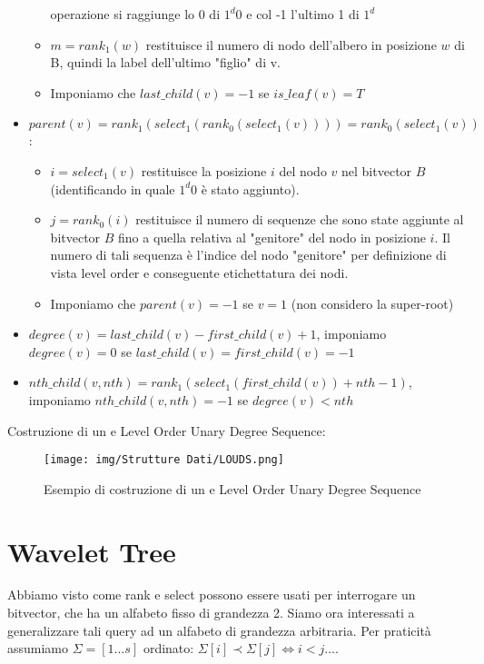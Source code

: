 \begin{itemize}
\begin{itemize}
                    operazione si raggiunge lo 0 di $1^d 0$ e col -1 l'ultimo 1 di $1^d$
              \item $m = rank_1(w)$ restituisce il numero di nodo dell'albero in
                    posizione $w$ di B, quindi la label dell'ultimo "figlio" di v.
              \item Imponiamo che $last\_child(v) = -1$ se $is\_leaf (v) = T$
          \end{itemize}
    \item $parent(v) = rank_1(select_1(rank_0(select_1(v)))) = rank_0(select_1(v))$:
          \begin{itemize}
              \item $i = select_1(v)$ restituisce la posizione $i$ del nodo $v$
                    nel bitvector $B$ (identificando in quale $1^d 0$ è stato aggiunto).
              \item $j = rank_0(i)$ restituisce il numero di sequenze che sono
                    state aggiunte al bitvector $B$ fino a quella relativa al "genitore"
                    del nodo in posizione $i$. Il numero di tali sequenza è l'indice del
                    nodo "genitore" per definizione di vista level order e conseguente
                    etichettatura dei nodi.
              \item Imponiamo che $parent(v) = -1$ se $v = 1$ (non considero la super-root)
          \end{itemize}
    \item $degree(v) = last\_child(v) - first\_child(v) + 1$, imponiamo $degree(v) = 0$
          se $last\_child(v) = first\_child(v) = -1$
    \item $nth\_child(v, nth) = rank_1(select_1(first\_child(v)) + nth - 1)$,
          imponiamo $nth\_child(v, nth) = -1$ se $degree(v) < nth$
\end{itemize}
\begin{esempio}
    Costruzione di un e Level Order Unary Degree Sequence:
    \begin{figure}[!ht]
        \centering
        \texttt{[image: img/Strutture Dati/LOUDS.png]}
        \caption{Esempio di costruzione di un e Level Order Unary Degree Sequence}
    \end{figure}
\end{esempio}
\section{Wavelet Tree}
Abbiamo visto come rank e select possono essere usati per interrogare un bitvector,
che ha un alfabeto fisso di grandezza 2. Siamo ora interessati a generalizzare
tali query ad un alfabeto di grandezza arbitraria. Per praticità assumiamo
$\Sigma = [1 \dots s]$ ordinato: $\Sigma[i] \prec \Sigma[j] \iff i < j \dots$.

